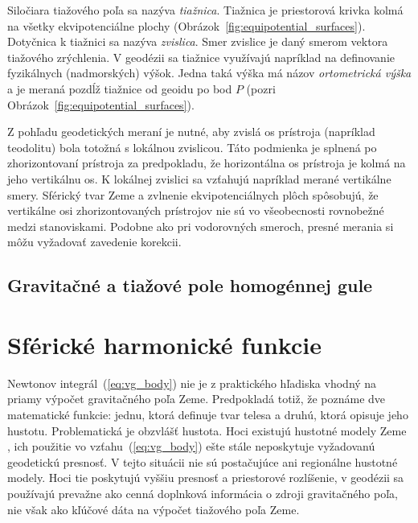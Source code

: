 \documentclass[a4paper, 12pt]{book}
\begin{document}
Siločiara tiažového poľa sa nazýva \emph{tiažnica}.  Tiažnica je priestorová 
krivka kolmá na všetky ekvipotenciálne plochy 
(Obrázok~\ref{fig:equipotential_surfaces}).  Dotyčnica k tiažnici sa nazýva 
\emph{zvislica}.  Smer zvislice je daný smerom vektora tiažového zrýchlenia.  
V geodézii sa tiažnice využívajú napríklad na definovanie fyzikálnych 
(nadmorských) výšok.  Jedna taká výška má názov \emph{ortometrická výška} a je 
meraná pozdĺž tiažnice od geoidu po bod $P$ (pozri 
Obrázok~\ref{fig:equipotential_surfaces}).

Z pohľadu geodetických meraní je nutné, aby zvislá os prístroja (napríklad 
teodolitu) bola totožná s lokálnou zvislicou.  Táto podmienka je splnená po 
zhorizontovaní prístroja za predpokladu, že horizontálna os prístroja je kolmá 
na jeho vertikálnu os.  K lokálnej zvislici sa vzťahujú napríklad merané 
vertikálne smery.  Sférický tvar Zeme a zvlnenie ekvipotenciálnych plôch 
spôsobujú, že vertikálne osi zhorizontovaných prístrojov nie sú vo všeobecnosti 
rovnobežné medzi stanoviskami.  Podobne ako pri vodorovných smeroch, presné 
merania si môžu vyžadovať zavedenie korekcii.






\section{Gravitačné a tiažové pole homogénnej gule}






\chapter{Sférické harmonické funkcie}
\label{sec:spherical_harmonics}

Newtonov integrál~(\ref{eq:vg_body}) nie je z praktického hľadiska vhodný na 
priamy výpočet gravitačného poľa Zeme.  Predpokladá totiž, že poznáme dve 
matematické funkcie: jednu, ktorá definuje tvar telesa a druhú, ktorá opisuje 
jeho hustotu.  Problematická je obzvlášť hustota.  Hoci existujú hustotné 
modely Zeme \citep[napríklad][]{Dziewonski1981}, ich použitie vo 
vzťahu~(\ref{eq:vg_body}) ešte stále neposkytuje vyžadovanú geodetickú 
presnosť.  V tejto situácii nie sú postačujúce ani regionálne hustotné modely.  
Hoci tie poskytujú vyššiu presnosť a priestorové rozlíšenie, v geodézii sa 
používajú prevažne ako cenná doplnková informácia o zdroji gravitačného poľa, 
nie však ako kľúčové dáta na výpočet tiažového poľa Zeme.
\end{document}
